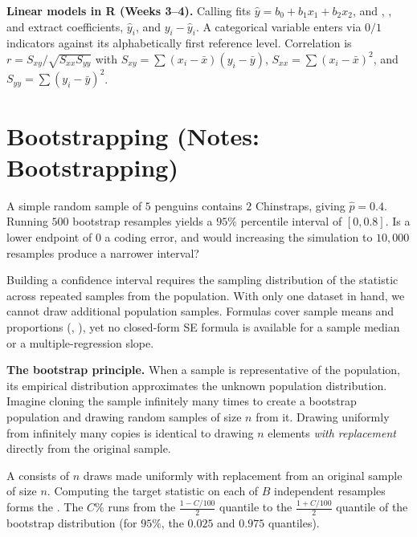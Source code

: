 \documentclass[10pt]{scrartcl}
\begin{document}
\begin{enumerate}[label=(W\arabic*),leftmargin=2.8em,itemsep=4pt]
  \ii {}\textbf{Linear models in R (Weeks 3--4).} Calling  fits $\hat y = b_0 + b_1x_1 + b_2x_2$, and , , and  extract coefficients, $\hat y_i$, and $y_i - \hat y_i$. A categorical variable enters via $0/1$ indicators against its alphabetically first reference level. Correlation is $r = S_{xy}/\sqrt{S_{xx}S_{yy}}$ with $S_{xy} = \sum (x_i - \bar x)(y_i - \bar y)$, $S_{xx} = \sum (x_i - \bar x)^2$, and $S_{yy} = \sum (y_i - \bar y)^2$.
\end{enumerate}

\section{Bootstrapping (Notes: Bootstrapping)}

\begin{qbox}
  A simple random sample of $5$ penguins contains $2$ Chinstraps, giving $\hat p = 0.4$. Running $500$ bootstrap resamples yields a $95\%$ percentile interval of $[0, 0.8]$. Is a lower endpoint of $0$ a coding error, and would increasing the simulation to $10{,}000$ resamples produce a narrower interval?
\end{qbox}

Building a confidence interval requires the sampling distribution of the statistic across repeated samples from the population. With only one dataset in hand, we cannot draw additional population samples. Formulas cover sample means and proportions (, ), yet no closed-form SE formula is available for a sample median or a multiple-regression slope.

\medskip\noindent\textbf{The bootstrap principle.} When a sample is representative of the population, its empirical distribution approximates the unknown population distribution. Imagine cloning the sample infinitely many times to create a bootstrap population and drawing random samples of size $n$ from it. Drawing uniformly from infinitely many copies is identical to drawing $n$ elements \emph{with replacement} directly from the original sample.

\begin{definition*}
  A  consists of $n$ draws made uniformly with replacement from an original sample of size $n$. Computing the target statistic on each of $B$ independent resamples forms the . The $C\%$  runs from the $\frac{1-C/100}{2}$ quantile to the $\frac{1+C/100}{2}$ quantile of the bootstrap distribution (for $95\%$, the $0.025$ and $0.975$ quantiles).
\end{definition*}
\end{document}
